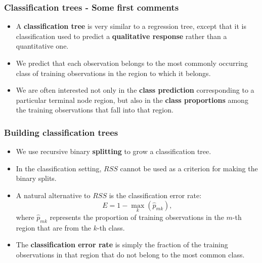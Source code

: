 \documentclass{beamer}
\begin{document}
\begin{frame}\frametitle{Classification trees - Some first comments}
\begin{itemize}
\item A \textbf{classification tree} is very similar to a regression tree, except that it is
classification
used to predict a \textbf{qualitative response }rather than a quantitative one.
\vspace*{0.2cm}
\item We predict that
each observation belongs to the most commonly occurring class of training
observations in the region to which it belongs.
\vspace*{0.2cm}
\item We are often interested not only in the \textbf{class prediction}
corresponding to a particular terminal node region, but also in the \textbf{class
proportions} among the training observations that fall into that region.
\end{itemize}
\end{frame}

\begin{frame}\frametitle{Building classification trees}
\begin{itemize}
\item We use recursive
binary \textbf{splitting} to grow a classification tree.
\vspace*{0.2cm}
\item In the classification setting, $RSS$ cannot be used as a
criterion for making the binary splits.
\vspace*{0.2cm}
\item A natural alternative to $RSS$ is the classification error rate:
$$E=1-\max_k(\hat{p}_{mk}),$$ where $\hat{p}_{mk}$ represents the proportion of training observations in the $m$-th
region that are from the $k$-th class.
\vspace*{0.2cm}
\item The \textbf{classification error rate} is
simply the fraction of the training observations in that region that do not
belong to the most common class.
\end{itemize}
\end{frame}
\end{document}
